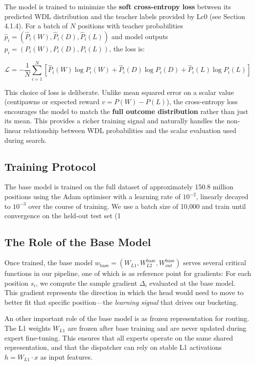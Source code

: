 The model is trained to minimize the \textbf{soft cross-entropy loss} between its predicted WDL distribution and the teacher labels provided by Lc0 (see Section 4.1.4). For a batch of $N$ positions with teacher probabilities $\hat{p}_i = (\hat{P}_i(W), \hat{P}_i(D), \hat{P}_i(L))$ and model outputs $p_i = (P_i(W), P_i(D), P_i(L))$, the loss is:

\[\mathcal{L} = -\frac{1}{N} \sum_{i=1}^N \left[ \hat{P}_i(W) \log P_i(W) + \hat{P}_i(D) \log P_i(D) + \hat{P}_i(L) \log P_i(L) \right]\]


This choice of loss is deliberate. Unlike mean squared error on a scalar value (centipawns or expected reward $v = P(W) - P(L)$), the cross-entropy loss encourages the model to match the \textbf{full outcome distribution} rather than just its mean. This provides a richer training signal and naturally handles the non-linear relationship between WDL probabilities and the scalar evaluation used during search.

\subsection{Training Protocol}

The base model is trained on the full dataset of approximately 150.8 million positions using the Adam optimiser with a learning rate of $10^{-2}$, linearly decayed to $10^{-3}$ over the course of training. We use a batch size of 10{,}000 and train until convergence on the held-out test set (1\\%

\subsection{The Role of the Base Model}

Once trained, the base model $w_{\text{base}} = (W_{L1}, W_{L2}^{\text{base}}, W_{out}^{\text{base}})$ serves several critical functions in our pipeline, one of which is as reference point for gradients: For each position $s_i$, we compute the sample gradient $\Delta_i$ evaluated at the base model. This gradient represents the direction in which the head would need to move to better fit that specific position---the \emph{learning signal} that drives our bucketing.

An other important role of the base model is as frozen representation for routing. The L1 weights $W_{L1}$ are frozen after base training and are never updated during expert fine-tuning. This ensures that all experts operate on the same shared representation, and that the dispatcher can rely on stable L1 activations $h = W_{L1} \cdot x$ as input features.

